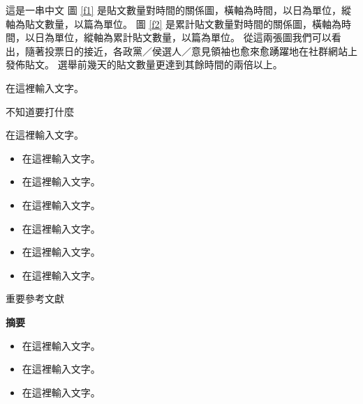 \documentclass[final,hyperref={pdfpagelabels=false}]{beamer}
\begin{document}
\begin{CJK}{UTF8}{bsmi}
\begin{frame}
\begin{minipage}{0.395\textwidth}
\begin{block}{這是一串中文}
圖 \ref{f1} 是貼文數量對時間的關係圖，橫軸為時間，以日為單位，縱軸為貼文數量，以篇為單位。%
圖 \ref{f2} 是累計貼文數量對時間的關係圖，橫軸為時間，以日為單位，縱軸為累計貼文數量，以篇為單位。%
從這兩張圖我們可以看出，隨著投票日的接近，各政黨／侯選人／意見領袖也愈來愈踴躍地在社群網站上發佈貼文。%
選舉前幾天的貼文數量更達到其餘時間的兩倍以上。%

    \begin{center}
      在這裡輸入文字。
    \end{center}

\end{block}
\end{minipage}
\quad
\begin{minipage}{0.585\textwidth}
\begin{block}{不知道要打什麼}
  \begin{center}
    在這裡輸入文字。
    \vspace*{8mm}
  \end{center}
  \begin{itemize}
    \item 在這裡輸入文字。
    \item 在這裡輸入文字。
    \item 在這裡輸入文字。
    \item 在這裡輸入文字。
    \item 在這裡輸入文字。
    \item 在這裡輸入文字。
  \end{itemize}
\end{block}
\end{minipage}

\begin{minipage}{0.64\textwidth}
\begin{block}{重要參考文獻}
  \nocite{*}
  
    
\end{block}
\end{minipage}
\quad
\begin{minipage}{0.34\textwidth}
\begin{alertblock}{\textbf{摘要}}
  \begin{itemize}
    \item 在這裡輸入文字。
    \item 在這裡輸入文字。
    \item 在這裡輸入文字。
  \end{itemize}
\end{alertblock}
\end{minipage}

\end{frame}
\end{CJK}
\end{document}

